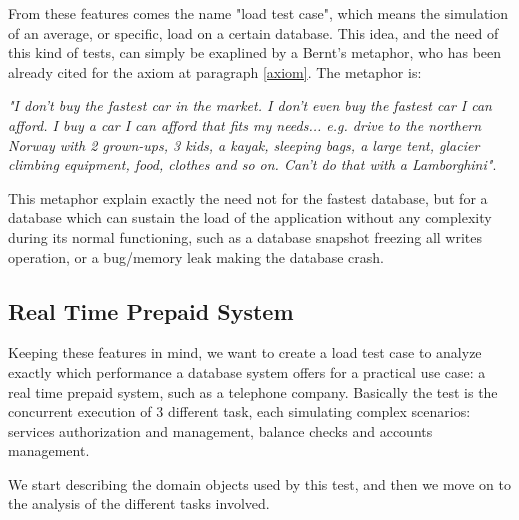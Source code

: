 From these features comes the name "load test case", which means the simulation of an average, or specific, load on a certain database. This idea, and the need of this kind of tests,  can simply be exaplined by a Bernt's metaphor, who has been already cited for the axiom at paragraph \ref{axiom}. The metaphor is:

\emph{"I don't buy the fastest car in the market. I don't even buy the fastest car I can afford. I buy a car I can afford that fits my needs... e.g. drive to the northern Norway with 2 grown-ups, 3 kids, a kayak, sleeping bags, a large tent, glacier climbing equipment, food, clothes and so on. Can't do that with a Lamborghini"}\cite{Bernt}.

This metaphor explain exactly the need not for the fastest database, but for a database which can sustain the load of the application without any complexity during its normal functioning, such as a database snapshot freezing all writes operation, or a bug/memory leak making the database crash.

		\subsection{Real Time Prepaid System}
Keeping these features in mind, we want to create a load test case to analyze exactly which performance  a database system  offers for a practical use case: a real time prepaid system, such as a telephone company. Basically the test is the concurrent execution of 3 different task, each simulating complex scenarios: services authorization and management, balance checks and accounts management.

We start describing the domain objects used by this test, and then we move on to the analysis of the different tasks involved.
		
